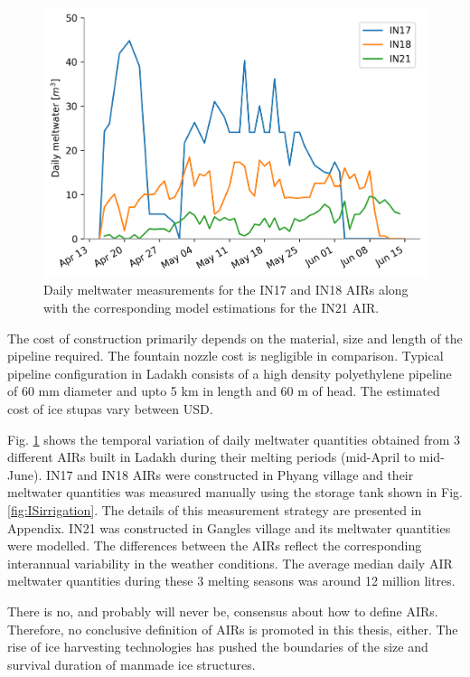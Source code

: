 \begin{figure}[htb]
\centering
\includegraphics[width=12cm]{figs/melt.png}

\caption{Daily meltwater measurements for the IN17 and IN18 AIRs along with the corresponding model estimations
for the IN21 AIR. }

\label{fig:ISmelt}
\end{figure}

The cost of construction primarily depends on the material, size and length of the pipeline required. The
fountain nozzle cost is negligible in comparison. Typical pipeline configuration in Ladakh consists of a high
density polyethylene pipeline of 60 mm diameter and upto 5 km in length and 60 m of head. The estimated cost
of ice stupas vary between USD.

Fig. \ref{fig:ISmelt} shows the temporal variation of daily meltwater quantities obtained from 3 different AIRs
built in Ladakh during their melting periods (mid-April to mid-June). IN17 and IN18 AIRs were constructed in
Phyang village and their meltwater quantities was measured manually using the storage tank shown in Fig.
\ref{fig:ISirrigation}. The details of this measurement strategy are presented in Appendix. IN21 was constructed
in Gangles village and its meltwater quantities were modelled. The differences between the AIRs reflect the
corresponding interannual variability in the weather conditions. The average median daily AIR meltwater
quantities during these 3 melting seasons was around 12 million litres.   

There is no, and probably will never be, consensus about how to define AIRs. Therefore, no conclusive definition
of AIRs is promoted in this thesis, either.
The rise of ice harvesting technologies has pushed the boundaries of the size and survival duration of manmade
ice structures.


